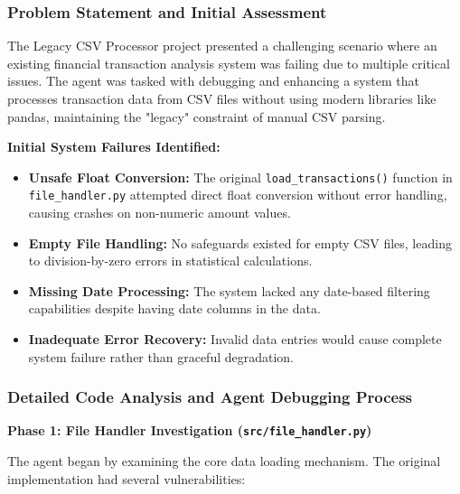 \documentclass[12pt, a4paper]{article}
\begin{document}
\subsubsection{Problem Statement and Initial Assessment}
The Legacy CSV Processor project presented a challenging scenario where an existing financial transaction analysis system was failing due to multiple critical issues. The agent was tasked with debugging and enhancing a system that processes transaction data from CSV files without using modern libraries like pandas, maintaining the "legacy" constraint of manual CSV parsing.

\textbf{Initial System Failures Identified:}
\begin{itemize}
    \item \textbf{Unsafe Float Conversion:} The original \texttt{load\_transactions()} function in \texttt{file\_handler.py} attempted direct float conversion without error handling, causing crashes on non-numeric amount values.
    \item \textbf{Empty File Handling:} No safeguards existed for empty CSV files, leading to division-by-zero errors in statistical calculations.
    \item \textbf{Missing Date Processing:} The system lacked any date-based filtering capabilities despite having date columns in the data.
    \item \textbf{Inadequate Error Recovery:} Invalid data entries would cause complete system failure rather than graceful degradation.
\end{itemize}

\subsubsection{Detailed Code Analysis and Agent Debugging Process}

\textbf{Phase 1: File Handler Investigation (\texttt{src/file\_handler.py})}

The agent began by examining the core data loading mechanism. The original implementation had several vulnerabilities:
\end{document}
